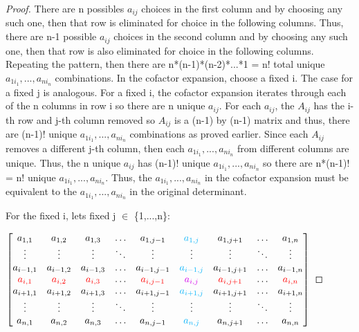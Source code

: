     \begin{proof}
        There are n possibles $a_{ij}$ choices in the first column and by choosing
        any such one, then that row is eliminated for choice in the following
        columns. Thus, there are n-1 possible $a_{ij}$ choices in the second column
        and by choosing any such one, then that row is also eliminated for choice
        in the following columns. Repeating the pattern, then
        there are n*(n-1)*(n-2)*...*1 = n! total unique
        $a_{1i_1},...,a_{ni_n}$ combinations.
        In the cofactor expansion, choose a fixed i. The case for a fixed j
        is analogous.
        For a fixed i, the cofactor expansion iterates through each of the n
        columns in row i so there are n unique $a_{ij}$.
        For each $a_{ij}$, the $A_{ij}$ has the i-th row and j-th column
        removed so $A_{ij}$ is a (n-1) by (n-1) matrix and thus, there
        are (n-1)! unique $a_{1i_1},...,a_{ni_n}$ combinations as proved earlier.
        Since each $A_{ij}$ removes a different j-th column, then each
        $a_{1i_1},...,a_{ni_n}$ from different columns are unique.
        Thus, the n unique $a_{ij}$ has (n-1)! unique $a_{1i_1},...,a_{ni_n}$
        so there are n*(n-1)! = n! unique $a_{1i_1},...,a_{ni_n}$.
        Thus, the $a_{1i_1},...,a_{ni_n}$ in the cofactor expansion must be
        equivalent to the $a_{1i_1},...,a_{ni_n}$ in the original determinant.

        For the fixed i, lets fixed j $\in$ \{1,...,n\}:

        \hspace{0.5cm}
        $
        \begin{bmatrix}
            a_{1,1} & a_{1,2} & a_{1,3} & \hdots
                    & a_{1,j-1} & {\color{lblue} a_{1,j}}
                    & a_{1,j+1} & \hdots & a_{1,n} \\
            \vdots & \vdots & \vdots & \ddots
                    & \vdots & \vdots & \vdots & \ddots & \vdots \\
            a_{i-1,1} & a_{i-1,2} & a_{i-1,3} & \hdots
                    & a_{i-1,j-1} & {\color{lblue} a_{i-1,j}}
                    & a_{i-1,j+1} & \hdots & a_{i-1,n} \\
            {\color{red} a_{i,1}} & {\color{red} a_{i,2}} & {\color{red} a_{i,3}}
                & \hdots & {\color{red} a_{i,j-1}} & {\color{purple} a_{i,j}}
                & {\color{red} a_{i,j+1}} & \hdots & {\color{red} a_{i,n}} \\
            a_{i+1,1} & a_{i+1,2} & a_{i+1,3} & \hdots
                    & a_{i+1,j-1} & {\color{lblue} a_{i+1,j}}
                    & a_{i+1,j+1} & \hdots & a_{i+1,n} \\
            \vdots & \vdots & \vdots & \ddots
                    & \vdots & \vdots & \vdots & \ddots & \vdots \\
            a_{n,1} & a_{n,2} & a_{n,3} & \hdots
                    & a_{n,j-1} & {\color{lblue} a_{n,j}}
                    & a_{n,j+1} & \hdots & a_{n,n} \\
        \end{bmatrix}
        $


\end{proof}
